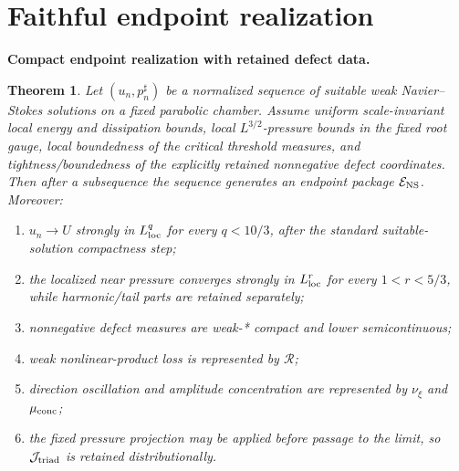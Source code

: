 \documentclass[11pt]{article}
\newtheorem{theorem}{Theorem}[section]
\theoremstyle{definition}\newtheorem{problem}[theorem]{Problem}
\theoremstyle{definition}
\theoremstyle{remark}
\begin{document}
\section{Faithful endpoint realization}

\medskip
\noindent\textbf{Compact endpoint realization with retained defect data.}
\begin{theorem}
Let \((u_n,p_n^\sharp)\) be a normalized sequence of suitable weak
Navier--Stokes solutions on a fixed parabolic chamber.  Assume uniform
scale-invariant local energy and dissipation bounds, local
\(L^{3/2}\)-pressure bounds in the fixed root gauge, local boundedness of the
critical threshold measures, and tightness/boundedness of the explicitly
retained nonnegative defect coordinates.  Then after a subsequence the
sequence generates an endpoint package \(\mathcal E_{\rm NS}\).  Moreover:
\begin{enumerate}[label=(\alph*),leftmargin=*]
\item \(u_n\to U\) strongly in \(L^q_{\rm loc}\) for every
      \(q<10/3\), after the standard suitable-solution compactness step;
\item the localized near pressure converges strongly in \(L^r_{\rm loc}\) for every
      \(1<r<5/3\), while harmonic/tail parts are retained separately;
\item nonnegative defect measures are weak-* compact and lower semicontinuous;
\item weak nonlinear-product loss is represented by \(\mathcal R\);
\item direction oscillation and amplitude concentration are represented by
      \(\nu_\xi\) and \(\mu_{\rm conc}\);
\item the fixed pressure projection may be applied before passage to the limit,
      so \(\mathcal J_{\rm triad}\) is retained distributionally.
\end{enumerate}
\end{theorem}
\end{document}
